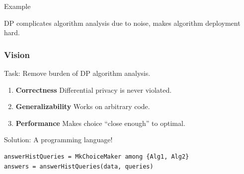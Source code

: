 \documentclass{beamer}
\begin{document}
\begin{frame}{Example}
\begin{center}
\end{center}
\pause
DP complicates algorithm analysis due to noise, makes algorithm deployment hard.
\end{frame}
\begin{frame}[fragile]\frametitle{Vision}
Task: Remove burden of DP algorithm analysis.
\begin{enumerate}
\item \textbf{Correctness} Differential privacy is never violated. 
\item \textbf{Generalizability} Works on arbitrary code.
\item \textbf{Performance} Makes choice ``close enough'' to optimal.
\end{enumerate}
\pause
Solution: A programming language!
\begin{lstlisting}[style=MyPythonStyle]
answerHistQueries = MkChoiceMaker among {Alg1, Alg2}
answers = answerHistQueries(data, queries)
\end{lstlisting}
\end{frame}
\end{document}
